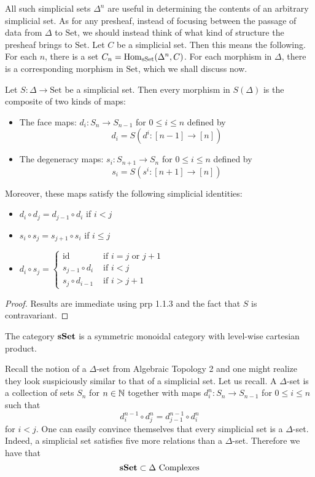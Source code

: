 \documentclass[a4paper]{article}
\begin{document}
All such simplicial sets $\Delta^n$ are useful in determining the contents of an arbitrary simplicial set. As for any presheaf, instead of focusing between the passage of data from $\Delta$ to $\text{Set}$, we should instead think of what kind of structure the presheaf brings to $\text{Set}$. Let $C$ be a simplicial set. Then this means the following. For each $n$, there is a set $C_n=\operatorname{Hom}_\text{sSet}(\Delta^n,C)$. For each morphism in $\Delta$, there is a corresponding morphism in $\text{Set}$, which we shall discuss now. 

\begin{prp}{}{} Let $S:\Delta\to\text{Set}$ be a simplicial set. Then every morphism in $S(\Delta)$ is the composite of two kinds of maps: 
\begin{itemize}
\item The face maps: $d_i:S_n\to S_{n-1}$ for $0\leq i\leq n$ defined by $$d_i=S(d^i:[n-1]\to[n])$$
\item The degeneracy maps: $s_i:S_{n+1}\to S_n$ for $0\leq i\leq n$ defined by $$s_i=S(s^i:[n+1]\to[n])$$
\end{itemize}
Moreover, these maps satisfy the following simplicial identities: 
\begin{itemize}
\item $d_i\circ d_j=d_{j-1}\circ d_i$ if $i<j$
\item $s_i\circ s_j=s_{j+1}\circ s_i$ if $i\leq j$
\item $d_i\circ s_j=\begin{cases}
\text{id} & \text{ if } i=j\text{ or }j+1\\
s_{j-1}\circ d_i & \text{ if } i<j\\
s_j\circ d_{i-1} & \text{ if }i>j+1
\end{cases}$
\end{itemize} \tcbline
\begin{proof}
Results are immediate using prp 1.1.3 and the fact that $S$ is contravariant. 
\end{proof}
\end{prp}

\begin{prp}{}{} The category $\bold{sSet}$ is a symmetric monoidal category with level-wise cartesian product. 
\end{prp}

Recall the notion of a $\Delta$-set from Algebraic Topology 2 and one might realize they look suspiciously similar to that of a simplicial set. Let us recall. A $\Delta$-set is a collection of sets $S_n$ for $n\in\mathbb{N}$ together with maps $d_i^n:S_n\to S_{n-1}$ for $0\leq i\leq n$ such that $$d_i^{n-1}\circ d_j^n=d_{j-1}^{n-1}\circ d_i^n$$ for $i<j$. One can easily convince themselves that every simplicial set is a $\Delta$-set. Indeed, a simplicial set satisfies five more relations than a $\Delta$-set. Therefore we have that $$\bold{sSet}\subset\Delta\text{ Complexes}$$
\end{document}
